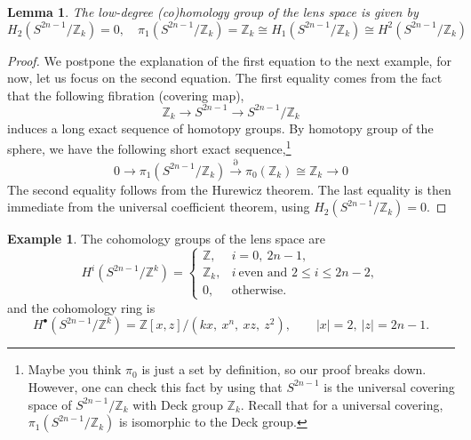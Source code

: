 \documentclass[a4paper,11pt]{article}
\newtheorem{lemma}[theorem]{Lemma}
\theoremstyle{definition}
\newtheorem{example}[theorem]{Example}
\theoremstyle{remark}
\begin{document}
\begin{lemma}\label{lemma:2.2}
	The low-degree (co)homology group of the lens space is given by
	\[
	H_2(S^{2n-1}/\mathbb{Z}_k)=0,\quad
	\pi_1(S^{2n-1}/\mathbb{Z}_k)=\mathbb{Z}_k\cong H_1(S^{2n-1}/\mathbb{Z}_k)\cong H^2(S^{2n-1}/\mathbb{Z}_k)
	\]
\end{lemma}
\begin{proof}
	We postpone the explanation of the first equation to the next example, for now, let us focus on the second equation. The first equality comes from the fact that the following fibration (covering map),
	\[
	\mathbb{Z}_k\longrightarrow S^{2n-1}\to S^{2n-1}/\mathbb{Z}_k
	\]
	induces a long exact sequence of homotopy groups. By homotopy group of the sphere, we have the following short exact sequence,\footnote{Maybe you think $\pi_0$ is just a set by definition, so our proof breaks down. However, one can check this fact by using that $S^{2n-1}$ is the universal covering space of $S^{2n-1}/\mathbb{Z}_k$ with Deck group $\mathbb{Z}_k$. Recall that for a universal covering, $\pi_1(S^{2n-1}/\mathbb{Z}_k)$ is isomorphic to the Deck group.}
	\[
	0\to\pi_1(S^{2n-1}/\mathbb{Z}_k)\xrightarrow{\partial}\pi_0(\mathbb{Z}_k)\cong\mathbb{Z}_k\to 0
	\]
	The second equality follows from the Hurewicz theorem. The last equality is then immediate from the universal coefficient theorem, using $H_2(S^{2n-1}/\mathbb{Z}_k)=0$.
\end{proof}
\begin{example}
	The cohomology groups of the lens space are
	\begin{equation}
		H^i({S^{2n-1}/\mathbb{Z}^k})=\begin{cases}
			\mathbb Z, & i=0,\ 2n-1,\\
			\mathbb Z_k, & i\ \text{even and } 2\le i\le 2n-2,\\
			0, & \text{otherwise}.
		\end{cases}
	\end{equation}
	and the cohomology ring is
	\begin{equation}
		\label{lens ring}
		H^\bullet(S^{2n-1}/\mathbb{Z}^k)=\mathbb Z[x,z]/{(kx,\ x^n,\ xz,\ z^2)},
		\qquad |x|=2,\ |z|=2n-1.
	\end{equation}
\end{example}
\end{document}
